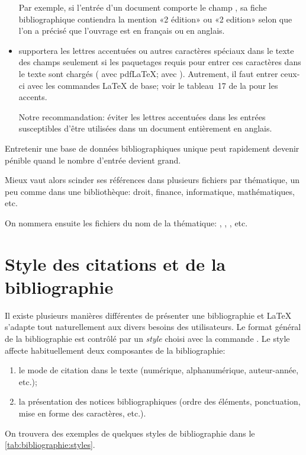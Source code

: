 \begin{itemize}
  Par exemple, si l'entrée d'un document comporte le champ
  , sa fiche bibliographique contiendra la mention
  «2{\ieme} édition» ou «2 edition» selon que l'on a précisé
  que l'ouvrage est en français ou en anglais.
\item {\BibTeX} supportera les lettres accentuées ou autres caractères
  spéciaux dans le texte des champs seulement si les paquetages requis
  pour entrer ces caractères dans le texte sont chargés
  ( avec pdf{\LaTeX};  avec {\XeLaTeX}).
  Autrement, il faut entrer ceux-ci avec les commandes {\LaTeX} de
  base; voir %
  le tableau~17 de la %
  pour les accents.

  Notre recommandation: éviter les lettres accentuées dans les
  entrées susceptibles d'être utilisées dans un document entièrement
  en anglais.
\end{itemize}

\begin{conseil}
  Entretenir une base de données bibliographiques unique peut
  rapidement devenir pénible quand le nombre d'entrée devient grand.

  Mieux vaut alors scinder ses références dans plusieurs fichiers par
  thématique, un peu comme dans une bibliothèque:
  droit, finance, informatique, mathématiques, etc.

  On nommera ensuite les fichiers du nom de la thématique:
  , ,
  , etc.
\end{conseil}



\section{Style des citations et de la bibliographie}
\label{sec:bibliographie:style}

Il existe plusieurs manières différentes de présenter une
bibliographie et {\LaTeX} s'adapte tout naturellement aux divers
besoins des utilisateurs. Le format général de la bibliographie est
contrôlé par un \emph{style} choisi avec la commande
\cmd{}. Le style affecte habituellement deux
composantes de la bibliographie:
\begin{enumerate}
\item le mode de citation dans le texte (numérique, alphanumérique,
  auteur-année, etc.);
\item la présentation des notices bibliographiques (ordre des
  éléments, ponctuation, mise en forme des caractères, etc.).
\end{enumerate}
On trouvera des exemples de quelques styles de bibliographie dans le
\autoref{tab:bibliographie:styles}.

